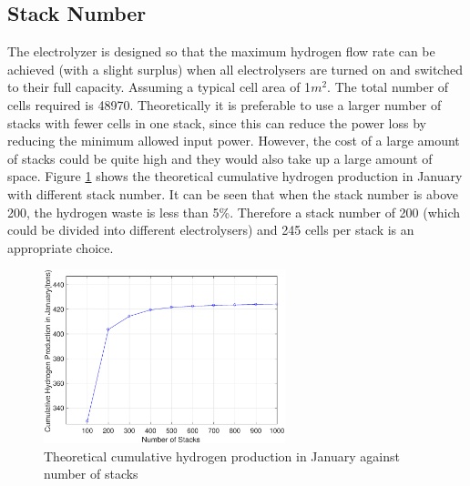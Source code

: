 \subsection{Stack Number}
The electrolyzer is designed so that the maximum hydrogen flow rate can be achieved (with a slight surplus) when all electrolysers are turned on and switched to their full capacity. 
Assuming a typical cell area of 1$m^2$. The total number of cells required is 48970. Theoretically it is preferable to use a larger number of stacks with fewer cells in one stack, since this can reduce the power loss by reducing the minimum allowed input power. However,  the cost of a large amount of stacks could be quite high and they would also take up a large amount of space. Figure \ref{fig:stack} shows the theoretical cumulative hydrogen production in January with different stack number. It can be seen that when the stack number is above 200, the hydrogen waste is less than 5\%. Therefore a stack number of 200 (which could be divided into different electrolysers) and  245 cells per stack is an appropriate choice.
 \begin{figure}[H] 
 \centering
\includegraphics[width=7cm]{stack.eps}
\caption{Theoretical cumulative hydrogen production in January against number of stacks}
\label{fig:stack}
\end{figure}
 

